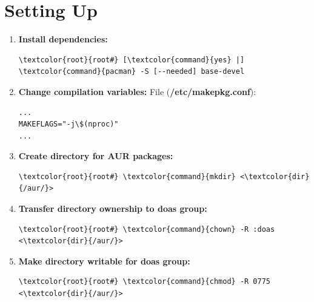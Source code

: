 \documentclass[10pt, a4paper, onecolumn, oneside, titlepage, openany]{book}
\begin{document}
\section{Setting Up}
\begin{enumerate}
    \item \textbf{Install dependencies:}
\begin{Verbatim}[commandchars=\\\{\}]
\textcolor{root}{root#} [\textcolor{command}{yes} |] \textcolor{command}{pacman} -S [--needed] base-devel
\end{Verbatim}
    \item \textbf{Change compilation variables:}
\newline File (\textbf{\textcolor{file}{/etc/makepkg.conf}}):
\begin{Verbatim}[commandchars=\\\{\}]
...
MAKEFLAGS="-j\$(nproc)"
...
\end{Verbatim}
    \item \textbf{Create directory for AUR packages:}
\begin{Verbatim}[commandchars=\\\{\}]
\textcolor{root}{root#} \textcolor{command}{mkdir} <\textcolor{dir}{/aur/}>
\end{Verbatim}
    \item \textbf{Transfer directory ownership to doas group:}
\begin{Verbatim}[commandchars=\\\{\}]
\textcolor{root}{root#} \textcolor{command}{chown} -R :doas <\textcolor{dir}{/aur/}>
\end{Verbatim}
    \item \textbf{Make directory writable for doas group:}
\begin{Verbatim}[commandchars=\\\{\}]
\textcolor{root}{root#} \textcolor{command}{chmod} -R 0775 <\textcolor{dir}{/aur/}>
\end{Verbatim}
\end{enumerate}
\end{document}
